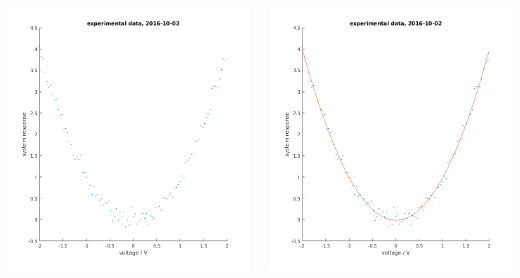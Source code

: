 \documentclass[11pt]{beamer}
\begin{document}
\begin{frame}[fragile]
  \begin{columns}
    \begin{column}{0.33\textwidth}
    \includegraphics[width=\textwidth]{./img/expt1.png}
    \end{column}
    \begin{column}{0.33\textwidth}
    \includegraphics[width=\textwidth]{./img/expt2.png}
    \end{column}
  \end{columns}
\end{frame}
\end{document}
